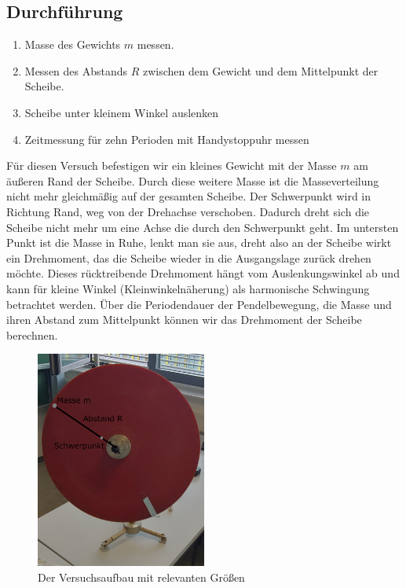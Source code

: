 \documentclass{article}
\begin{document}
		\subsection{Durchführung}
			\begin{enumerate}
				\item Masse des Gewichts \(m\) messen.
				\item Messen des Abstands \(R\) zwischen dem Gewicht und dem Mittelpunkt der Scheibe.
				\item Scheibe unter kleinem Winkel auslenken
				\item Zeitmessung für zehn Perioden mit Handystoppuhr messen
			\end{enumerate} %
			Für diesen Versuch befestigen wir ein kleines Gewicht mit der Masse \(m\) am äußeren Rand der Scheibe.
			Durch diese weitere Masse ist die Masseverteilung nicht mehr gleichmäßig auf der gesamten Scheibe. Der Schwerpunkt wird in Richtung Rand, weg von der Drehachse verschoben.
			Dadurch dreht sich die Scheibe nicht mehr um eine Achse die durch den Schwerpunkt geht.
			Im untersten Punkt ist die Masse in Ruhe, lenkt man sie aus, dreht also an der Scheibe wirkt ein Drehmoment, das die Scheibe wieder in die Ausgangslage zurück drehen möchte.
			Dieses rücktreibende Drehmoment hängt vom Auslenkungswinkel ab und kann für kleine Winkel (Kleinwinkelnäherung) als harmonische Schwingung betrachtet werden.
			Über die Periodendauer der Pendelbewegung, die Masse und ihren Abstand zum Mittelpunkt können wir das Drehmoment der Scheibe berechnen.

			\begin{figure}[!ht]
				\centering
				\includegraphics[width=0.5\textwidth]{schwingung_aufbau.png}
				\caption{\label{fig:Schwingung_Aufbau}Der Versuchsaufbau mit relevanten Größen}
			\end{figure}
\end{document}
